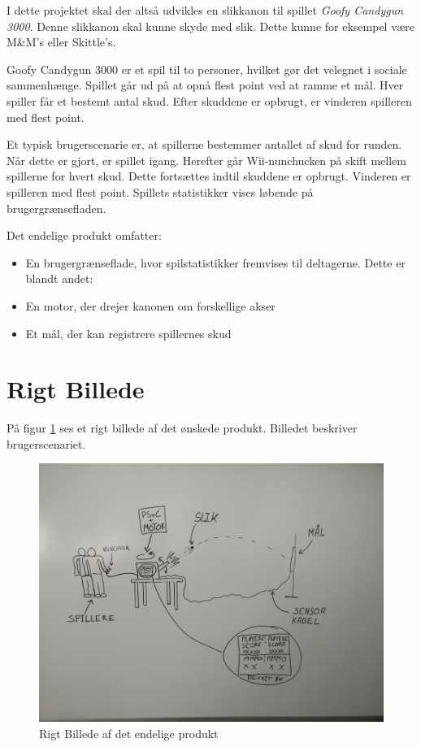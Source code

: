 I dette projektet skal der altså udvikles en slikkanon til spillet \textit{Goofy Candygun 3000}. Denne slikkanon skal kunne skyde med slik. Dette kunne for eksempel være M\&M’s eller Skittle’s.

Goofy Candygun 3000 er et spil til to personer, hvilket gør det velegnet i sociale sammenhænge. Spillet går ud på at opnå flest point ved at ramme et mål. Hver spiller får et bestemt antal skud. Efter skuddene er opbrugt, er vinderen spilleren med flest point.

Et typisk brugerscenarie er, at spillerne bestemmer antallet af skud for runden. Når dette er gjort, er spillet igang. Herefter går Wii-nunchucken på skift mellem spillerne for hvert skud. Dette fortsættes indtil skuddene er opbrugt. Vinderen er spilleren med flest point. Spillets statistikker vises løbende på brugergrænsefladen. 

Det endelige produkt omfatter:
\begin{itemize}
	\item{En brugergrænseflade, hvor spilstatistikker fremvises til deltagerne. Dette er blandt andet:}
	\item{En motor, der drejer kanonen om forskellige akser}
	\item{Et mål, der kan registrere spillernes skud}
\end{itemize}

\newpage
\section{Rigt Billede}

På figur \ref{ref:RigtBillede} ses et rigt billede af det ønskede produkt. Billedet beskriver brugerscenariet.

\begin{figure}[H]
	\centering
	\includegraphics[width=\textwidth]{Projektformulering/images/rigtBillede}
	\caption{Rigt Billede af det endelige produkt}
	\label{ref:RigtBillede}
\end{figure}

